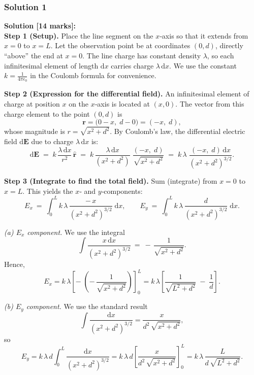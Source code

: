 \documentclass{article}
\begin{document}
\subsubsection{Solution 1}

\noindent
\textbf{Solution [14 marks]:}\\[6pt]
\textbf{Step 1 (Setup).}
Place the line segment on the $x$‐axis so that it extends from $x=0$ to $x=L$.  
Let the observation point be at coordinates $(0,d)$, directly ``above'' the end at $x=0$.  
The line charge has constant density $\lambda$, so each infinitesimal element of length $\mathrm{d}x$ 
carries charge $\lambda\,\mathrm{d}x$.  
We use the constant $k = \tfrac{1}{4\pi\epsilon_0}$ in the Coulomb formula for convenience.

\bigskip
\noindent
\textbf{Step 2 (Expression for the differential field).}
An infinitesimal element of charge at position $x$ on the $x$‐axis is located at $(x,0)$.  
The vector from this charge element to the point $(0,d)$ is 
\[
  \mathbf{r} = \bigl(0 - x,\; d - 0\bigr) = (-x,\; d),
\]
whose magnitude is $r = \sqrt{x^2 + d^2}$.  
By Coulomb’s law, the differential electric field $\mathrm{d}\mathbf{E}$ due to charge $\lambda\,\mathrm{d}x$ is:
\[
  \mathrm{d}\mathbf{E}
  \;=\;
  k\,\frac{\lambda\,\mathrm{d}x}{r^2}\,\hat{\mathbf{r}}
  \;=\;
  k\,\frac{\lambda\,\mathrm{d}x}{(x^2 + d^2)}\;\frac{(-x,\;d)}{\sqrt{x^2 + d^2}}
  \;=\;
  k\,\lambda\;\frac{(-x,\;d)\,\mathrm{d}x}{(x^2 + d^2)^{3/2}}.
\]

\bigskip
\noindent
\textbf{Step 3 (Integrate to find the total field).}
Sum (integrate) from $x=0$ to $x=L$.  This yields the $x$‐ and $y$‐components:
\[
E_x
~=~
\int_{0}^{L}
k\,\lambda\,\frac{-\,x}{(x^2 + d^2)^{3/2}}\;\mathrm{d}x,
\qquad
E_y
~=~
\int_{0}^{L}
k\,\lambda\,\frac{d}{(x^2 + d^2)^{3/2}}\;\mathrm{d}x.
\]

\noindent
\emph{(a) $E_x$ component.}  
We use the integral
\[
  \int \frac{x\,\mathrm{d}x}{(x^2 + d^2)^{3/2}}
  ~=~
  -\,\frac{1}{\sqrt{x^2 + d^2}}.
\]
Hence,
\[
  E_x
  =
  k\,\lambda
  \left[
    -\;\left(-\,\frac{1}{\sqrt{x^2 + d^2}}\right)
  \right]_{0}^{L}
  =
  k\,\lambda
  \left[
    \frac{1}{\sqrt{L^2 + d^2}}
    \;-\;
    \frac{1}{d}
  \right].
\]

\noindent
\emph{(b) $E_y$ component.}  
We use the standard result
\[
  \int \frac{\mathrm{d}x}{(x^2 + d^2)^{3/2}}
  =
  \frac{x}{d^2\,\sqrt{x^2 + d^2}},
\]
so
\[
  E_y
  =
  k\,\lambda\,d
  \int_{0}^{L}
    \frac{\mathrm{d}x}{(x^2 + d^2)^{3/2}}
  =
  k\,\lambda\,d
  \left[
    \frac{x}{d^2\,\sqrt{x^2 + d^2}}
  \right]_{0}^{L}
  =
  k\,\lambda
  \,\frac{L}{d\,\sqrt{L^2 + d^2}}.
\]
\end{document}
